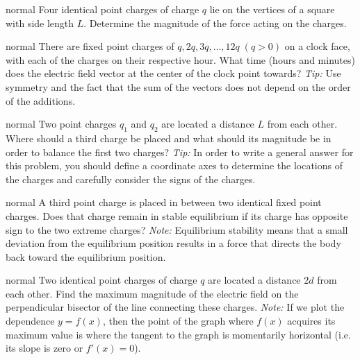 \hypertarget{P61}{}
\begin{solution}{normal} %
Four identical point charges of charge $q$ lie on the vertices of a square with side length $L$. Determine the magnitude of the force acting on the charges.
\end{solution}

\hypertarget{P62}{}
\begin{solution}{normal} %
There are fixed point charges of $q,2q,3q,\dots,12q\;(q>0)$ on a clock face, with each of the charges on their respective hour. What time (hours and minutes) does the electric field vector at the center of the clock point towards? \textit{Tip:} Use symmetry and the fact that the sum of the vectors does not depend on the order of the additions.
\end{solution}

\hypertarget{P63}{}
\begin{solution}{normal} %
Two point charges $q_1$ and $q_2$ are located a distance $L$ from each other. Where should a third charge be placed and what should its magnitude be in order to balance the first two charges? \textit{Tip:} In order to write a general answer for this problem, you should define a coordinate axes to determine the locations of the charges and carefully consider the signs of the charges.
\end{solution}

\hypertarget{P64}{}
\begin{solution}{normal} %
A third point charge is placed in between two identical fixed point charges. Does that charge remain in stable equilibrium if its charge has opposite sign to the two extreme charges? \textit{Note:} Equilibrium stability means that a small deviation from the equilibrium position results in a force that directs the body back toward the equilibrium position.
\end{solution}

\hypertarget{P65}{}
\begin{solution}{normal} %
Two identical point charges of charge $q$ are located a distance $2d$ from each other. Find the maximum magnitude of the electric field on the perpendicular bisector of the line connecting these charges. \textit{Note:} If we plot the dependence $y=f(x)$, then the point of the graph where $f(x)$ acquires its maximum value is where the tangent to the graph is momentarily horizontal (i.e. its slope is zero or $f'(x)=0$).
\end{solution}

